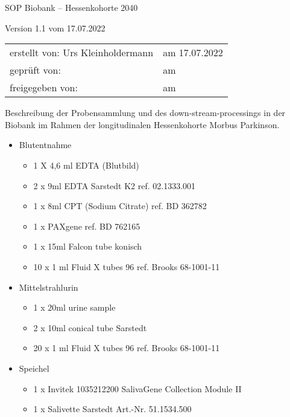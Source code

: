 \begin{center}
  {\Huge SOP Biobank -- Hessenkohorte 2040}
  
  Version 1.1 vom 17.07.2022 
\end{center}

\vspace*{1cm}

\begin{tabular}{@{}p{}l}
  erstellt von: Urs Kleinholdermann & am 17.07.2022 \\
  geprüft von: & am \\
  freigegeben von: & am \\
\end{tabular}

\vspace*{2cm}


Beschreibung der Probensammlung und des down-stream-processings in der Biobank im Rahmen der longitudinalen Hessenkohorte Morbus Parkinson. \\


\begin{itemize}
  \item Blutentnahme 	
    \begin{itemize}
      \item 1 X 4,6 ml EDTA (Blutbild)
      \item 2 x 9ml EDTA Sarstedt K2 ref. 02.1333.001 
      \item 1 x 8ml CPT (Sodium Citrate) ref. BD 362782
      \item 1 x PAXgene ref. BD 762165
      \item 1 x 15ml Falcon tube konisch 
      \item10 x 1 ml Fluid X tubes 96 ref. Brooks 68-1001-11 
    \end{itemize}
  \item Mittelstrahlurin
    \begin{itemize}
      \item 1 x 20ml urine sample 
      \item 2 x 10ml conical tube Sarstedt
      \item 20 x 1 ml Fluid X tubes 96 ref. Brooks 68-1001-11
    \end{itemize}
  \item Speichel
    \begin{itemize}
      \item 1 x Invitek 1035212200 SalivaGene Collection Module II
      \item 1 x Salivette Sarstedt Art.-Nr. 51.1534.500
    \end{itemize}
\end{itemize}

